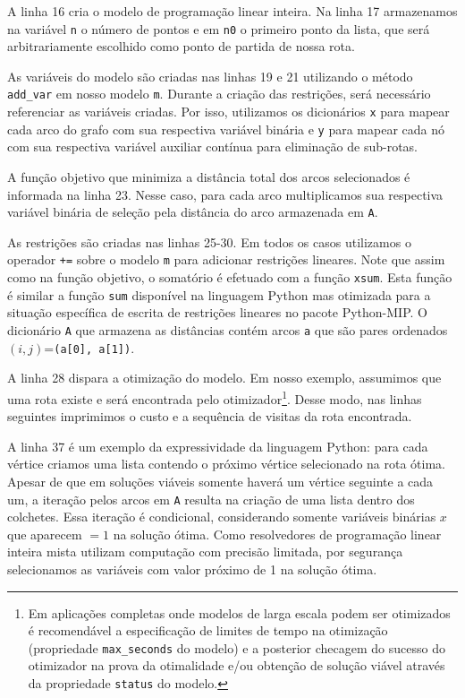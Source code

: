 \documentclass[a4paper,11pt,fleqn]{article}
\begin{document}
A linha 16 cria o modelo de programação linear inteira. Na linha 17 armazenamos na variável \texttt{n} o número de pontos e em \texttt{n0} o primeiro ponto da lista, que será arbitrariamente escolhido como ponto de partida de nossa rota. 

As variáveis do modelo são criadas nas linhas 19 e 21 utilizando o método \texttt{add\_var} em nosso modelo \texttt{m}. Durante a criação das restrições, será necessário referenciar as variáveis criadas. Por isso, utilizamos os dicionários \texttt{x} para mapear cada arco do grafo com sua respectiva variável binária e \texttt{y} para mapear cada nó com sua respectiva variável auxiliar contínua para eliminação de sub-rotas.

A função objetivo que minimiza a distância total dos arcos selecionados é informada na linha 23. Nesse caso, para cada arco multiplicamos sua respectiva variável binária de seleção pela distância do arco armazenada em \texttt{A}.

As restrições são criadas nas linhas 25-30. Em todos os casos utilizamos o operador \texttt{+=} sobre o modelo \texttt{m} para adicionar restrições lineares. Note que assim como na função objetivo, o somatório é efetuado com a função \texttt{xsum}. Esta função é similar a função \texttt{sum} disponível na linguagem Python mas otimizada para a situação específica de escrita de restrições lineares no pacote Python-MIP\@. O dicionário \texttt{A} que armazena as distâncias contém arcos \texttt{a} que são pares ordenados $(i,j)$=\texttt{(a[0], a[1])}. 

A linha 28 dispara a otimização do modelo. Em nosso exemplo, assumimos que uma rota existe e será encontrada pelo otimizador\footnote{Em aplicações completas onde modelos de larga escala podem ser otimizados é recomendável a especificação de limites de tempo na otimização (propriedade \texttt{max\_seconds} do modelo) e a posterior checagem do sucesso do otimizador na prova da otimalidade e/ou obtenção de solução viável através da propriedade \texttt{status} do modelo.}. Desse modo, nas linhas seguintes imprimimos o custo e a sequência de visitas da rota encontrada. 

A linha 37 é um exemplo da expressividade da linguagem Python: para cada vértice criamos uma lista contendo o próximo vértice selecionado na rota ótima. Apesar de que em soluções viáveis somente haverá um vértice seguinte a cada um, a iteração pelos arcos em \texttt{A} resulta na criação de uma lista dentro dos colchetes. Essa iteração é condicional, considerando somente variáveis binárias $x$ que aparecem $=1$ na solução ótima. Como resolvedores de programação linear inteira mista utilizam computação com precisão limitada, por segurança selecionamos as variáveis com valor próximo de 1 na solução ótima. 
\end{document}
